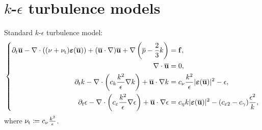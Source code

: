 \documentclass[11pt]{article}
\numberwithin{equation}{section}
\begin{document}
\section{$k$-$\epsilon$ turbulence models}
Standard $k$-$\epsilon$ turbulence model:
\begin{equation}
    \label{k-epsilon}
    \left\{\begin{split}
        \partial_t\overline{\bf u} - \nabla\cdot\left((\nu + \nu_{\rm t})\boldsymbol{\varepsilon}(\overline{\bf u})\right) + (\overline{\bf u}\cdot\nabla)\overline{\bf u} + \nabla\left(\overline{p} - \frac{2}{3}k\right) &= {\bf f},\\
        \nabla\cdot\overline{\bf u} &= 0,\\
        \partial_tk - \nabla\cdot\left(c_k\frac{k^2}{\epsilon}\nabla k\right)+ \overline{\bf u}\cdot\nabla k &= c_\nu\frac{k^2}{\epsilon}|\boldsymbol{\varepsilon}(\overline{\bf u})|^2 - \epsilon,\\
        \partial_t\epsilon - \nabla\cdot\left(c_\varepsilon\frac{k^2}{\epsilon}\nabla\epsilon\right) + \overline{\bf u}\cdot\nabla\epsilon &= c_\eta k|\boldsymbol{\varepsilon}(\overline{\bf u})|^2 - (c_{\varepsilon 2} - c_\gamma)\frac{\epsilon^2}{k},
    \end{split}\right.
\end{equation}
where $\nu_{\rm t}\coloneqq c_\nu\frac{k^2}{\epsilon}$.



\printbibliography[heading=bibintoc]
\end{document}
